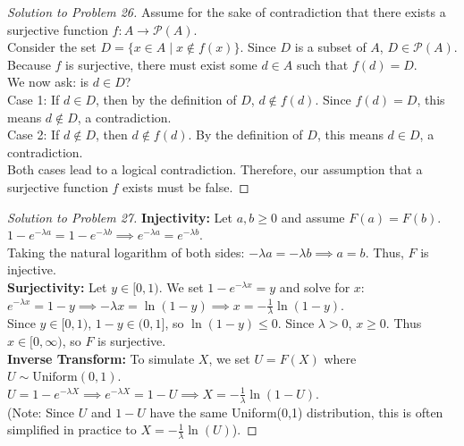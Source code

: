 \documentclass[11pt, letterpaper]{article}
\theoremstyle{definition}
\theoremstyle{remark}
\begin{document}
\begin{proof}[Solution to Problem 26]
Assume for the sake of contradiction that there exists a surjective function $f : A \to \mathcal{P}(A)$. \\
Consider the set $D = \{ x \in A \mid x \notin f(x) \}$. Since $D$ is a subset of $A$, $D \in \mathcal{P}(A)$. \\
Because $f$ is surjective, there must exist some $d \in A$ such that $f(d) = D$. \\
We now ask: is $d \in D$? \\
Case 1: If $d \in D$, then by the definition of $D$, $d \notin f(d)$. Since $f(d) = D$, this means $d \notin D$, a contradiction. \\
Case 2: If $d \notin D$, then $d \notin f(d)$. By the definition of $D$, this means $d \in D$, a contradiction. \\
Both cases lead to a logical contradiction. Therefore, our assumption that a surjective function $f$ exists must be false.
\end{proof}

\begin{proof}[Solution to Problem 27]
\textbf{Injectivity:} Let $a, b \ge 0$ and assume $F(a) = F(b)$. \\
$1 - e^{-\lambda a} = 1 - e^{-\lambda b} \implies e^{-\lambda a} = e^{-\lambda b}$. \\
Taking the natural logarithm of both sides: $-\lambda a = -\lambda b \implies a = b$. Thus, $F$ is injective. \\
\textbf{Surjectivity:} Let $y \in [0, 1)$. We set $1 - e^{-\lambda x} = y$ and solve for $x$: \\
$e^{-\lambda x} = 1 - y \implies -\lambda x = \ln(1 - y) \implies x = -\frac{1}{\lambda} \ln(1 - y)$. \\
Since $y \in [0, 1)$, $1 - y \in (0, 1]$, so $\ln(1 - y) \le 0$. Since $\lambda > 0$, $x \ge 0$. Thus $x \in [0, \infty)$, so $F$ is surjective. \\
\textbf{Inverse Transform:} To simulate $X$, we set $U = F(X)$ where $U \sim \text{Uniform}(0,1)$. \\
$U = 1 - e^{-\lambda X} \implies e^{-\lambda X} = 1 - U \implies X = -\frac{1}{\lambda} \ln(1 - U)$. \\
(Note: Since $U$ and $1-U$ have the same Uniform(0,1) distribution, this is often simplified in practice to $X = -\frac{1}{\lambda} \ln(U)$).
\end{proof}
\end{document}
